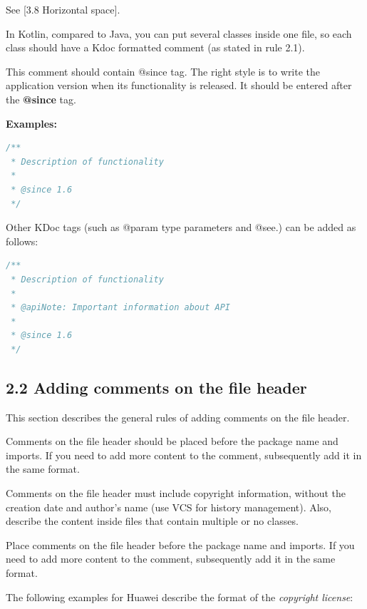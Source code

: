 {{{{{{{{{{{{{{{{See [3.8 Horizontal space].



In Kotlin, compared to Java, you can put several classes inside one file, so each class should have a Kdoc formatted comment (as stated in rule 2.1).

This comment should contain @since tag. The right style is to write the application version when its functionality is released. It should be entered after the \textbf{@since} tag.



\textbf{Examples:}



\begin{lstlisting}[language=Kotlin]
/**
 * Description of functionality
 *
 * @since 1.6
 */
\end{lstlisting}


Other KDoc tags (such as @param type parameters and @see.) can be added as follows:

\begin{lstlisting}[language=Kotlin]
/**
 * Description of functionality
 *
 * @apiNote: Important information about API
 *
 * @since 1.6
 */
\end{lstlisting}


\subsection*{\textbf{2.2 Adding comments on the file header}}

\label{sec:2.2}



This section describes the general rules of adding comments on the file header.

Comments on the file header should be placed before the package name and imports. If you need to add more content to the comment, subsequently add it in the same format.



Comments on the file header must include copyright information, without the creation date and author's name (use VCS for history management). Also, describe the content inside files that contain multiple or no classes.



Place comments on the file header before the package name and imports. If you need to add more content to the comment, subsequently add it in the same format.



The following examples for Huawei describe the format of the \textit{copyright license}: \

}}}}}}}}}}}}}}}}
